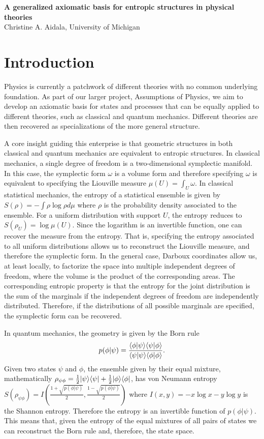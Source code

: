 \begin{center}
	\textbf{A generalized axiomatic basis for entropic structures in physical theories} \\
	Christine A. Aidala, University of Michigan
\end{center}

\section{Introduction}

Physics is currently a patchwork of different theories with no common underlying foundation. As part of our larger project, Assumptions of Physics, we aim to develop an axiomatic basis for states and processes that can be equally applied to different theories, such as classical and quantum mechanics. Different theories are then recovered as specializations of the more general structure.

A core insight guiding this enterprise is that geometric structures in both classical and quantum mechanics are equivalent to entropic structures. In classical mechanics, a single degree of freedom is a two-dimensional symplectic manifold. In this case, the symplectic form $\omega$ is a volume form and therefore specifying $\omega$ is equivalent to specifying the Liouville measure $\mu(U) = \int_U \omega$. In classical statistical mechanics, the entropy of a statistical ensemble is given by $S(\rho) = - \int \rho \log \rho d\mu$ where $\rho$ is the probability density associated to the ensemble. For a uniform distribution with support $U$, the entropy reduces to $S(\rho_U) = \log \mu(U)$. Since the logarithm is an invertible function, one can recover the measure from the entropy. That is, specifying the entropy associated to all uniform distributions allows us to reconstruct the Liouville measure, and therefore the symplectic form. In the general case, Darboux coordinates allow us, at least locally, to factorize the space into multiple independent degrees of freedom, where the volume is the product of the corresponding areas. The corresponding entropic property is that the entropy for the joint distribution is the sum of the marginals if the independent degrees of freedom are independently distributed. Therefore, if the distributions of all possible marginals are specified, the symplectic form can be recovered.

In quantum mechanics, the geometry is given by the Born rule
\begin{equation}
	p(\phi|\psi) = \frac{\langle \phi | \psi \rangle\langle \psi | \phi \rangle}{\langle \psi | \psi \rangle\langle \phi | \phi \rangle}.
\end{equation}
Given two states $\psi$ and $\phi$, the ensemble given by their equal mixture, mathematically $\rho_{\psi\phi} = \frac{1}{2}|\psi\rangle\langle\psi|+\frac{1}{2}|\phi\rangle\langle\phi|$,  has von Neumann entropy $S(\rho_{\psi\phi}) = I\left(\frac{1 + \sqrt{p(\phi|\psi)}}{2},\frac{1 - \sqrt{p(\phi|\psi)}}{2} \right)$ where $I(x,y) = -x \log x -y \log y$ is the Shannon entropy. Therefore the entropy is an invertible function of $p(\phi|\psi)$. This means that, given the entropy of the equal mixtures of all pairs of states we can reconstruct the Born rule and, therefore, the state space.


